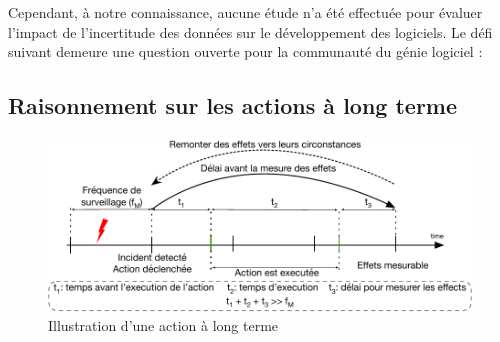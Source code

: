 %
Cependant, à notre connaissance, aucune étude n'a été effectuée pour évaluer l'impact de l'incertitude des données sur le développement des logiciels. 
Le défi suivant demeure une question ouverte pour la communauté du génie logiciel :
\vspace{-2em}

\subsection{Raisonnement sur les actions à long terme}
\label{sec:french:challenges:longTermAct}

\begin{figure}
	\centering
	\includegraphics[width=0.9\linewidth]{img/apdx-french/challenges/longTermAct}
	\caption{Illustration d'une action à long terme}
	\label{fig:french:chal:longTermAct}
\end{figure}

